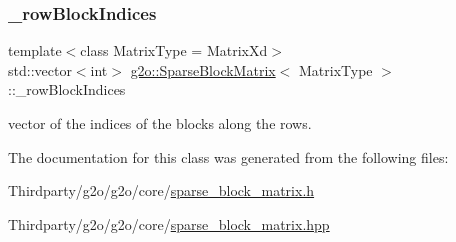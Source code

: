 \subsubsection{\texorpdfstring{\+\_\+row\+Block\+Indices}{\_rowBlockIndices}}
{\footnotesize\ttfamily template$<$class Matrix\+Type = Matrix\+Xd$>$ \\
std\+::vector$<$int$>$ \mbox{\hyperlink{classg2o_1_1_sparse_block_matrix}{g2o\+::\+Sparse\+Block\+Matrix}}$<$ Matrix\+Type $>$\+::\+\_\+row\+Block\+Indices\hspace{0.3cm}{\ttfamily [protected]}}



vector of the indices of the blocks along the rows. 



The documentation for this class was generated from the following files\+:\begin{DoxyCompactItemize}
\item 
Thirdparty/g2o/g2o/core/\mbox{\hyperlink{sparse__block__matrix_8h}{sparse\+\_\+block\+\_\+matrix.\+h}}\item 
Thirdparty/g2o/g2o/core/\mbox{\hyperlink{sparse__block__matrix_8hpp}{sparse\+\_\+block\+\_\+matrix.\+hpp}}\end{DoxyCompactItemize}
